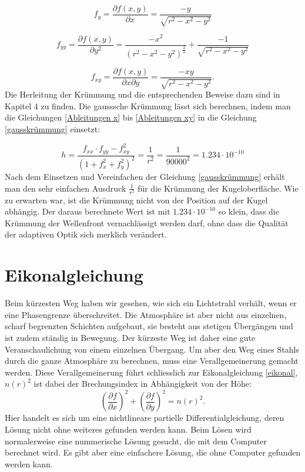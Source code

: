 \begin{refsection}
\begin{equation}\label{Ableitungen y}
f_{y} =\dfrac{\partial f(x,y)}{\partial x}= \dfrac{-y}{\sqrt{r^{2}-x^{2}-y^{2}}}
\end{equation}

\begin{equation}\label{Ableitungen yy}
f_{yy}=\dfrac{\partial f(x,y)}{\partial y^{2}}= \dfrac{- x^2}{(r^2 - x^2 - y^2)^{\frac{2}{3}}}+\dfrac{ - 1}{\sqrt{r^2 - x^2 - y^2}}
\end{equation}

\begin{equation}\label{Ableitungen xy}
f_{xy}=\dfrac{\partial f(x,y)}{\partial x \partial y}=  \dfrac{-xy}{\sqrt{r^{2}-x^{2}-y^{2}}}.
\end{equation}
Die Herleitung der Krümmung und die entsprechenden Beweise dazu sind in Kapitel 4 zu finden. Die gausssche Krümmung lässt sich berechnen, indem man die Gleichungen \eqref{Ableitungen x} bis \eqref{Ableitungen xy} in die Gleichung \eqref{gausskrümmung} einsetzt:  

\begin{equation}\label{gausskrümmung}
h = \dfrac{f_{xx} \cdot f_{yy} -f_{xy}^{2}}{(1+f_{x}^{2}+f_{y}^{2})^{2}} = \dfrac{1}{r^{2}} =\dfrac{1}{90000^{2}} = 1.234\cdot 10^{-10}
\end{equation}
Nach dem Einsetzen und Vereinfachen der Gleichung \eqref{gausskrümmung}
erhält man den sehr einfachen Ausdruck $\frac{1}{r^{2}}$ für die
Krümmung der Kugeloberfläche. Wie zu erwarten war, ist die Krümmung
nicht von der Position auf der Kugel abhängig.
Der daraus berechnete Wert ist mit $1.234\cdot 10^{-10}$ so klein,
dass die Krümmung der Wellenfront vernachlässigt werden darf, ohne
dass die Qualität der adaptiven Optik sich merklich verändert.

\section{Eikonalgleichung}
%
Beim kürzesten Weg haben wir gesehen, wie sich ein Lichtstrahl
verhält, wenn er eine Phasengrenze überschreitet. Die Atmosphäre
ist aber nicht aus einzelnen, scharf begrenzten Schichten aufgebaut,
sie besteht aus stetigen Übergängen und ist zudem ständig in
Bewegung. Der kürzeste Weg ist daher eine gute Veranschaulichung
von einem einzelnen Übergang. Um aber den Weg eines Stahls durch die
ganze Atmosphäre zu berechnen, muss eine Verallgemeinerung gemacht
werden. Diese Verallgemeinerung führt schliesslich zur Eikonalgleichung
\eqref{eikonal}, $n(r)^{2}$ ist dabei der Brechungsindex in Abhängigkeit
von der Höhe:
\begin{equation}\label{eikonal}
\left( \dfrac{\partial f}{\partial x}\right)^{2} + \left( \dfrac{\partial f}{\partial y}\right) ^{2} = n(r)^{2}.
\end{equation}
Hier handelt  es sich um eine nichtlineare partielle
Differentialgleichung, deren Lösung nicht ohne weiteres gefunden werden
kann. Beim Lösen wird normalerweise eine nummerische Lösung gesucht,
die mit dem Computer berechnet wird. Es gibt aber eine einfachere
Lösung, die ohne Computer gefunden werden kann.


\end{refsection}
